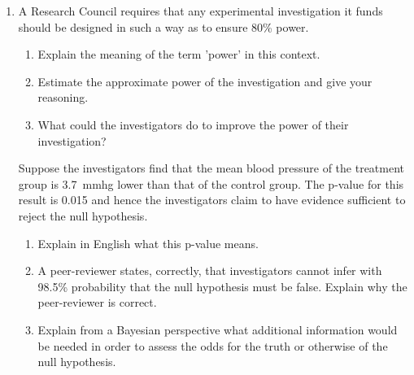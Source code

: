 \documentclass[a4paper,12pt,fleqn]{article}
\begin{document}
\begin{enumerate}[label=\alph*)]
	\item A Research Council requires that any experimental investigation it funds should be designed in such a way as to ensure 80\% power. 
	\begin{enumerate}[label=\roman*)]
	\item Explain the meaning of the term 'power' in this context.
	\item  Estimate the approximate power of the investigation and give your reasoning.
	\item What could the investigators do to improve the power of their investigation?
	\end{enumerate}
	
	
	
%	
%	

	Suppose the investigators find that the mean blood pressure of the treatment group is \SI{3.7}{mmhg} lower than that of the control group. The p-value for this result is 0.015 and hence the investigators claim to have evidence sufficient to reject the null hypothesis.
	\begin{enumerate}[label=\roman*)]
	\item Explain in English what this p-value means.
	\item A peer-reviewer states, correctly, that investigators cannot infer with 98.5\% probability that the null hypothesis must be false. Explain why the peer-reviewer is correct.
	\item Explain from a Bayesian perspective what additional information would be needed in order to assess the odds for the truth or otherwise of the null hypothesis.
	\end{enumerate}	
%	
%	
\end{enumerate}
\end{document}
